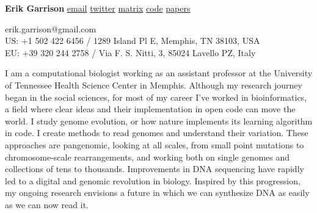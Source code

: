 \documentclass[11pt,hidelinks,letterpaper]{article}
\begin{document}
\begin{flushleft}
{\huge
  \textbf{Erik Garrison}
}
\vspace*{0.05in}
\newline
{\large
      \href{mailto:erik.garrison@gmail.com}{email}
      \href{https://twitter.com/erikgarrison}{twitter}
      \href{https://matrix.to/#/@erikgarrison:matrix.org}{matrix}
      \href{https://github.com/ekg}{code}
      \href{https://scholar.google.com/citations?user=d5TKoncAAAAJ&hl=en}{papers}
}

{\small
  erik.garrison@gmail.com \\
  US: +1 502 422 6456 /
  1289 Island Pl E, Memphis, TN 38103, USA \\
  EU: +39 320 244 2758 /
  Via F. S. Nitti, 3, 85024 Lavello PZ, Italy
}
\end{flushleft}

\begin{comment}
{\it \large
  Pangenomicist with a quantitative social science background.
  Harvard undergrad, Cambridge PhD.
  Learned in the ways of free culture.
  Sharing in the powers of free software.
  Lover of commonwealths.
  Born in Kentucky, matured in Massachusetts, honed in England.
  Lives in Tennessee and Italy, travelling the world, both physically and virtually.
}
\end{comment}


{\large
  I am a computational biologist working as an assistant professor at the University of Tennessee Health Science Center in Memphis.
  Although my research journey began in the social sciences, for most of my career I've worked in bioinformatics, a field where clear ideas and their implementation in open code can move the world.
  I study genome evolution, or how nature implements its learning algorithm in code.
  I create methods to read genomes and understand their variation.
  These approaches are pangenomic, looking at all scales, from small point mutations to chromosome-scale rearrangements, and working both on single genomes and collections of tens to thousands.
  Improvements in DNA sequencing have rapidly led to a digital and genomic revolution in biology.
  Inspired by this progression, my ongoing research envisions a future in which we can synthesize DNA as easily as we can now read it.
}
\end{document}
